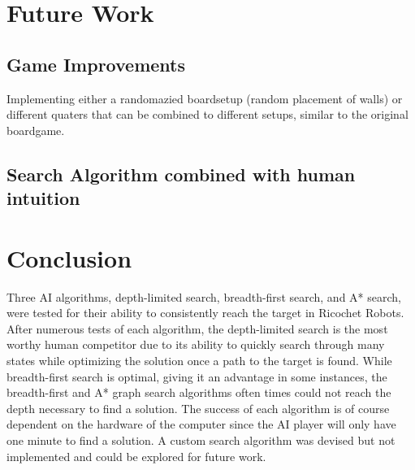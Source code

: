 \documentclass[a4paper,10pt]{article}
\begin{document}
\section{Future Work}
\subsection{Game Improvements}
Implementing either a randomazied boardsetup (random placement of walls) or different quaters that can be combined to different setups, similar to the original boardgame.
\subsection{Search Algorithm combined with human intuition}



\section{Conclusion}
Three AI algorithms, depth-limited search, breadth-first search, and A* search, were tested for their ability to consistently reach the target in Ricochet Robots. After numerous tests of each algorithm, the depth-limited search is
the most worthy human competitor due to its ability to quickly search through many states while optimizing the solution once a path to the target is found. While breadth-first
search is optimal, giving it an advantage in some instances, the breadth-first and A* graph search algorithms often times could not reach the depth necessary to find a solution.
The success of each algorithm is of course dependent on the hardware of the computer since the AI player will only have one minute to find a solution. A custom search
algorithm was devised but not implemented and could be explored for future work.



\end{document}
